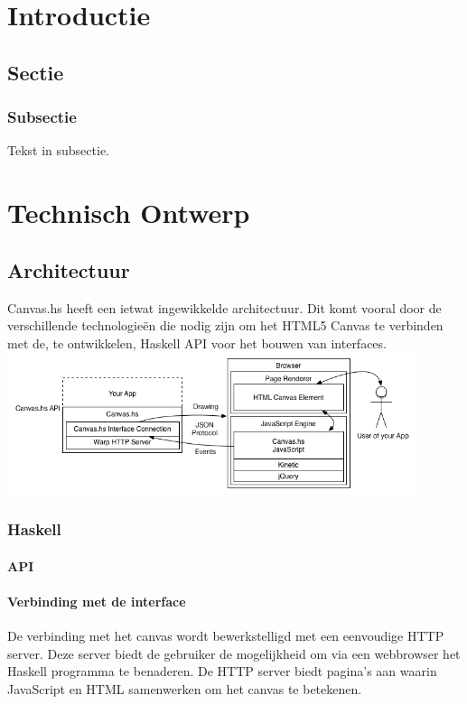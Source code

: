 \documentclass[a4paper]{report}
\begin{document}


\chapter{Introductie}
\section{Sectie}
\subsection{Subsectie}
Tekst in subsectie.

\chapter{Technisch Ontwerp}
\section{Architectuur}
Canvas.hs heeft een ietwat ingewikkelde architectuur. Dit komt vooral door de verschillende technologieën die nodig zijn om het HTML5 Canvas te verbinden met de, te ontwikkelen, Haskell API voor het bouwen van interfaces.
\includegraphics[keepaspectratio,width=0.9\textwidth]{architecture.png}
\subsection{Haskell}

\subsubsection{API}
\subsubsection{Verbinding met de interface}
De verbinding met het canvas wordt bewerkstelligd met een eenvoudige HTTP server. Deze server biedt de gebruiker de mogelijkheid om via een webbrowser het Haskell programma te benaderen. De HTTP server biedt pagina's aan waarin JavaScript en HTML samenwerken om het canvas te betekenen.
\end{document}
